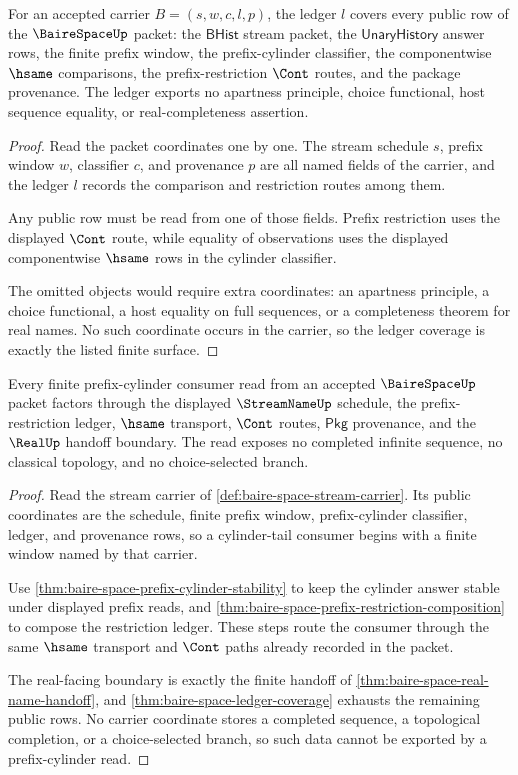 \begin{theorem}
\label{thm:baire-space-ledger-coverage}
For an accepted carrier $B=(s,w,c,l,p)$, the ledger $l$ covers every public
row of the $\BaireSpaceUp$ packet: the $\mathsf{BHist}$ stream packet, the
$\mathsf{UnaryHistory}$ answer rows, the finite prefix window, the
prefix-cylinder classifier, the componentwise $\hsame$ comparisons, the
prefix-restriction $\Cont$ routes, and the package provenance. The ledger
exports no apartness principle, choice functional, host sequence equality, or
real-completeness assertion.
\end{theorem}
\begin{proof}
Read the packet coordinates one by one. The stream schedule $s$, prefix window
$w$, classifier $c$, and provenance $p$ are all named fields of the carrier,
and the ledger $l$ records the comparison and restriction routes among them.

Any public row must be read from one of those fields. Prefix restriction uses
the displayed $\Cont$ route, while equality of observations uses the displayed
componentwise $\hsame$ rows in the cylinder classifier.

The omitted objects would require extra coordinates: an apartness principle,
a choice functional, a host equality on full sequences, or a completeness
theorem for real names. No such coordinate occurs in the carrier, so the
ledger coverage is exactly the listed finite surface.
\end{proof}

\begin{theorem}
\label{thm:baire-space-cylinder-tail-coverage}
Every finite prefix-cylinder consumer read from an accepted $\BaireSpaceUp$
packet factors through the displayed $\StreamNameUp$ schedule, the
prefix-restriction ledger, $\hsame$ transport, $\Cont$ routes, $\mathsf{Pkg}$
provenance, and the $\RealUp$ handoff boundary. The read exposes no completed
infinite sequence, no classical topology, and no choice-selected branch.
\end{theorem}
\begin{proof}
Read the stream carrier of \autoref{def:baire-space-stream-carrier}. Its public
coordinates are the schedule, finite prefix window, prefix-cylinder classifier,
ledger, and provenance rows, so a cylinder-tail consumer begins with a finite
window named by that carrier.

Use \autoref{thm:baire-space-prefix-cylinder-stability} to keep the cylinder
answer stable under displayed prefix reads, and
\autoref{thm:baire-space-prefix-restriction-composition} to compose the
restriction ledger. These steps route the consumer through the same $\hsame$
transport and $\Cont$ paths already recorded in the packet.

The real-facing boundary is exactly the finite handoff of
\autoref{thm:baire-space-real-name-handoff}, and
\autoref{thm:baire-space-ledger-coverage} exhausts the remaining public rows.
No carrier coordinate stores a completed sequence, a topological completion, or
a choice-selected branch, so such data cannot be exported by a prefix-cylinder
read.
\end{proof}

